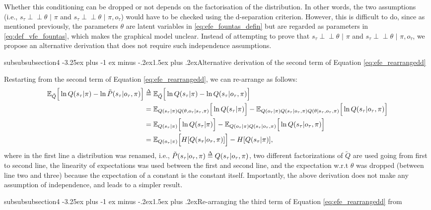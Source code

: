 \documentclass[twoside,11pt]{article}
\makeatletter
\def\delequal{\mathrel{\ensurestackMath{\stackon[1pt]{=}{\scriptstyle\Delta}}}}
\newcommand{\indep}{\perp \! \! \! \perp}
\newcounter{subsubsubsection}[subsubsection]
\def\subsubsubsection{\@startsection
     {subsubsubsection}{4}{\z@} {-3.25ex plus -1
     ex minus -.2ex}{1.5ex plus .2ex}{\normalsize\bf}}
\makeatother
\begin{document}
Whether this conditioning can be dropped or not depends on the factorisation of the distribution. In other words, the two assumptions (i.e., $s_\tau \indep \theta \,\,|\,\, \pi$ and $s_\tau \indep \theta \,\,| \,\,\pi, o_\tau$) would have to be checked using the d-separation criterion. However, this is difficult to do, since as mentioned previously, the parameters $\theta$ are latent variables in \eqref{eq:efe_fountas_defin} but are regarded as parameters in \eqref{eq:def_vfe_fountas}, which makes the graphical model unclear. Instead of attempting to prove that $s_\tau \indep \theta \,\,|\,\, \pi$ and $s_\tau \indep \theta \,\,| \,\,\pi, o_\tau$, we propose an alternative derivation that does not require such independence assumptions.

\subsubsubsection{Alternative derivation of the second term of Equation  \eqref{eq:efe_rearrangedd}}

Restarting from the second term of Equation \eqref{eq:efe_rearrangedd}, we can  re-arrange as follows:
\begin{align*}
\mathbb{E}_{\tilde{Q}}\Big[ \ln Q(s_\tau|\pi) - \ln \tilde{P}(s_\tau|o_\tau, \pi) \Big] &\delequal \mathbb{E}_{\tilde{Q}}\Big[ \ln Q(s_\tau|\pi) - \ln Q(s_\tau|o_\tau, \pi) \Big]\\
&= \mathbb{E}_{Q(s_\tau|\pi)Q(\theta,o_\tau|s_\tau,\pi)}\Big[ \ln Q(s_\tau|\pi)\Big] - \mathbb{E}_{Q(o_\tau|\pi)Q(s_\tau|o_\tau,\pi)Q(\theta|s_\tau,o_\tau,\pi)}\Big[ \ln Q(s_\tau|o_\tau, \pi) \Big]\\
&= \mathbb{E}_{Q(s_\tau|\pi)}\Big[ \ln Q(s_\tau|\pi)\Big] - \mathbb{E}_{Q(o_\tau|\pi)Q(s_\tau|o_\tau,\pi)}\Big[ \ln Q(s_\tau|o_\tau, \pi) \Big]\\
&= \mathbb{E}_{Q(o_\tau|\pi)}\Big[ H[Q(s_\tau|o_\tau, \pi)] \Big] - H[Q(s_\tau|\pi)],
\end{align*}
where in the first line a distribution was renamed, i.e., $\tilde{P}(s_\tau|o_\tau, \pi) \delequal Q(s_\tau|o_\tau, \pi)$, two different factorizations of $\tilde{Q}$ are used going from first to second line, the linearity of expectations was used between the first and second line, and the expectation w.r.t $\theta$ was dropped (between line two and three) because the expectation of a constant is the constant itself. Importantly, the above derivation does not make any assumption of independence, and leads to a simpler result.

\subsubsubsection{Re-arranging the third term of Equation \eqref{eq:efe_rearrangedd} from \citet{DeepAIwithMCMC}}
\end{document}
